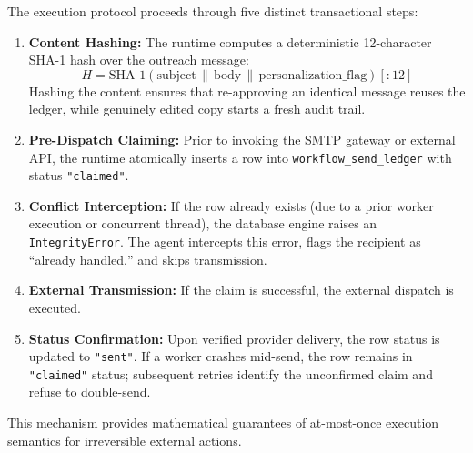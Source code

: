 \documentclass[10pt,a4paper,twocolumn]{article}
\begin{document}
The execution protocol proceeds through five distinct transactional steps:
\begin{enumerate}[leftmargin=*]
  \item \textbf{Content Hashing:} The runtime computes a deterministic 12-character SHA-1 hash over the outreach message:
  \begin{equation}
  H = \text{SHA-1}(\text{subject} \,\|\, \text{body} \,\|\, \text{personalization\_flag})[:12]
  \end{equation}
  Hashing the content ensures that re-approving an identical message reuses the ledger, while genuinely edited copy starts a fresh audit trail.
  \item \textbf{Pre-Dispatch Claiming:} Prior to invoking the SMTP gateway or external API, the runtime atomically inserts a row into \texttt{workflow\_send\_ledger} with status \texttt{"claimed"}.
  \item \textbf{Conflict Interception:} If the row already exists (due to a prior worker execution or concurrent thread), the database engine raises an \texttt{IntegrityError}. The agent intercepts this error, flags the recipient as ``already handled,'' and skips transmission.
  \item \textbf{External Transmission:} If the claim is successful, the external dispatch is executed.
  \item \textbf{Status Confirmation:} Upon verified provider delivery, the row status is updated to \texttt{"sent"}. If a worker crashes mid-send, the row remains in \texttt{"claimed"} status; subsequent retries identify the unconfirmed claim and refuse to double-send.
\end{enumerate}
This mechanism provides mathematical guarantees of at-most-once execution semantics for irreversible external actions.
\end{document}
